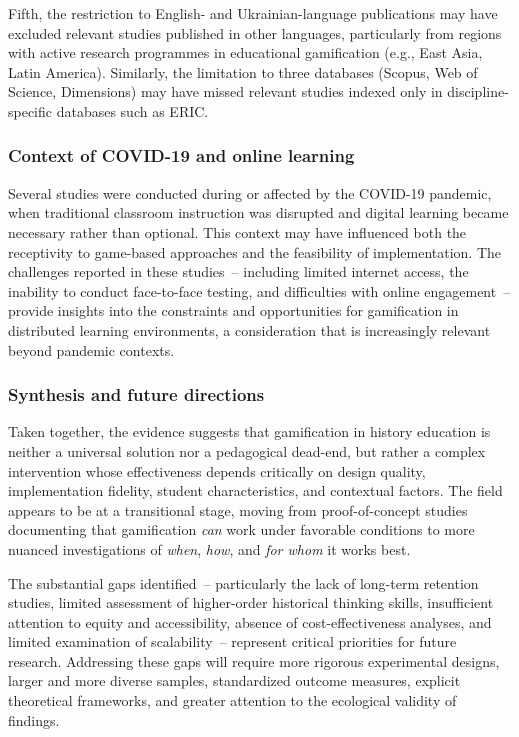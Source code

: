 \documentclass[a4paper,fleqn]{cas-sc}
\begin{document}
Fifth, the restriction to English- and Ukrainian-language publications may have excluded relevant studies published in other languages, particularly from regions with active research programmes in educational gamification (e.g., East Asia, Latin America). Similarly, the limitation to three databases (Scopus, Web of Science, Dimensions) may have missed relevant studies indexed only in discipline-specific databases such as ERIC.

\subsubsection{Context of COVID-19 and online learning}

Several studies \citep{22Nugroho2020149, 35Fernandez2023, 42Huffer201581, 77Ramansyah2021} were conducted during or affected by the COVID-19 pandemic, when traditional classroom instruction was disrupted and digital learning became necessary rather than optional. This context may have influenced both the receptivity to game-based approaches and the feasibility of implementation. The challenges reported in these studies~-- including limited internet access, the inability to conduct face-to-face testing, and difficulties with online engagement~-- provide insights into the constraints and opportunities for gamification in distributed learning environments, a consideration that is increasingly relevant beyond pandemic contexts.

\subsubsection{Synthesis and future directions}

Taken together, the evidence suggests that gamification in history education is neither a universal solution nor a pedagogical dead-end, but rather a complex intervention whose effectiveness depends critically on design quality, implementation fidelity, student characteristics, and contextual factors. The field appears to be at a transitional stage, moving from proof-of-concept studies documenting that gamification \emph{can} work under favorable conditions to more nuanced investigations of \emph{when}, \emph{how}, and \emph{for whom} it works best.

The substantial gaps identified~-- particularly the lack of long-term retention studies, limited assessment of higher-order historical thinking skills, insufficient attention to equity and accessibility, absence of cost-effectiveness analyses, and limited examination of scalability~-- represent critical priorities for future research. Addressing these gaps will require more rigorous experimental designs, larger and more diverse samples, standardized outcome measures, explicit theoretical frameworks, and greater attention to the ecological validity of findings.
\end{document}
